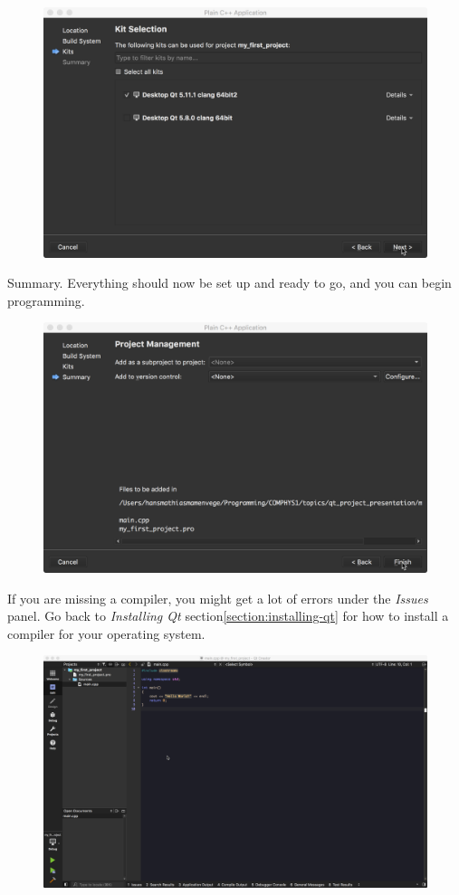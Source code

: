 \documentclass[11pt]{article}
\begin{document}
\begin{figure}[H]
    \centering
    \includegraphics[width=\textwidth]{figures/new_project/select_kit.png}
\end{figure}
Summary. Everything should now be set up and ready to go, and you can begin programming.
\begin{figure}[H]
    \centering
    \includegraphics[width=\textwidth]{figures/new_project/summary.png}
\end{figure}
If you are missing a compiler, you might get a lot of errors under the \textit{Issues} panel. Go back to \textit{Installing Qt} section\ref{section:installing-qt} for how to install a compiler for your operating system.
\begin{figure}[H]
    \centering
    \includegraphics[width=\textwidth]{figures/new_project/edit_project_screen.png}
\end{figure}
\end{document}
